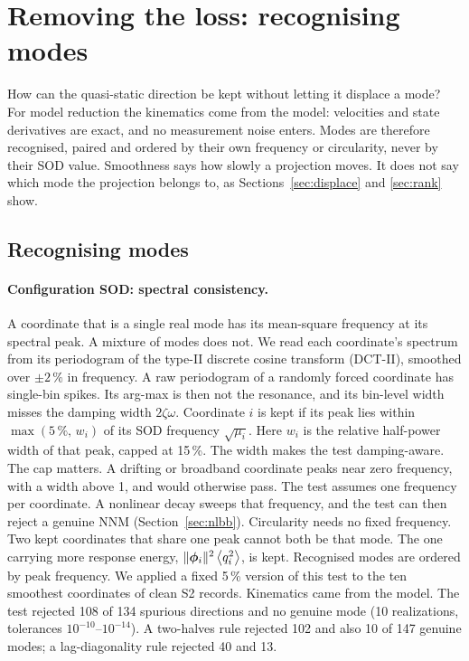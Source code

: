 \documentclass[preprint,12pt]{elsarticle}
\begin{document}
\section{Removing the loss: recognising modes}\label{sec:noise}
How can the quasi-static direction be kept without letting it displace a mode?
For model reduction the kinematics come from the model: velocities and state derivatives are exact, and no measurement noise enters.
Modes are therefore recognised, paired and ordered by their own frequency or circularity, never by their SOD value. Smoothness says how slowly a projection moves. It does not say which mode the projection belongs to, as Sections~\ref{sec:displace} and \ref{sec:rank} show.

\subsection{Recognising modes}\label{sec:recog}
\paragraph{Configuration SOD: spectral consistency.} A coordinate that is a single real mode has its mean-square frequency at its spectral peak. A mixture of modes does not. We read each coordinate's spectrum from its periodogram of the type-II discrete cosine transform (DCT-II), smoothed over $\pm2\,\%$ in frequency. A raw periodogram of a randomly forced coordinate has single-bin spikes. Its arg-max is then not the resonance, and its bin-level width misses the damping width $2\zeta\omega$. Coordinate $i$ is kept if its peak lies within $\max(5\,\%,\,w_i)$ of its SOD frequency $\sqrt{\mu_i}$. Here $w_i$ is the relative half-power width of that peak, capped at 15\,\%. The width makes the test damping-aware. The cap matters. A drifting or broadband coordinate peaks near zero frequency, with a width above 1, and would otherwise pass. The test assumes one frequency per coordinate. A nonlinear decay sweeps that frequency, and the test can then reject a genuine NNM (Section~\ref{sec:nlbb}). Circularity needs no fixed frequency. Two kept coordinates that share one peak cannot both be that mode. The one carrying more response energy, $\|\bm{\phi}_i\|^2\left\langle q_i^2 \right\rangle$, is kept. Recognised modes are ordered by peak frequency.
We applied a fixed 5\,\% version of this test to the ten smoothest coordinates of clean S2 records. Kinematics came from the model. The test rejected 108 of 134 spurious directions and no genuine mode (10 realizations, tolerances $10^{-10}$--$10^{-14}$). A two-halves rule rejected 102 and also 10 of 147 genuine modes; a lag-diagonality rule rejected 40 and 13.
\end{document}
